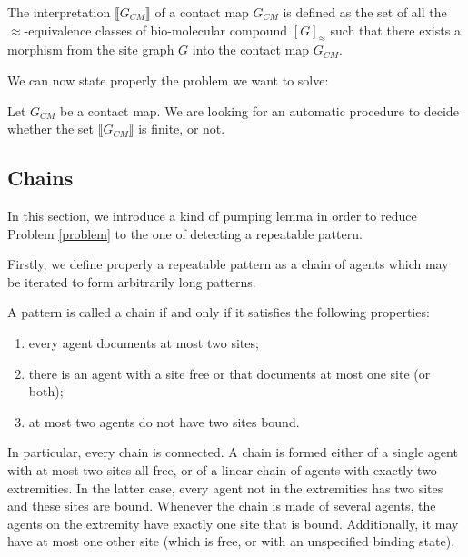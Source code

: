 \documentclass{entcs}
\newcommand{\graphsymb}{G}
\newcommand{\iso}{\approx}
\begin{document}
\begin{defn}
The interpretation $\llbracket \graphsymb_{\textit{CM}} \rrbracket$ of a contact map $\graphsymb_{\textit{CM}}$ is defined as the set of all the $\iso$-equivalence classes of bio-molecular compound $[G]_{\iso}$ such that there exists a morphism from the site graph $G$ into the contact map $\graphsymb_{\textit{CM}}$.
\end{defn}

We can now state properly the problem we want to solve:
\begin{problem}\label{problem}
Let $\graphsymb_{\textit{CM}}$ be a contact map.
We are looking for an automatic procedure to decide whether
the set $\llbracket \graphsymb_{\textit{CM}} \rrbracket$ is finite, or not.
\end{problem}

\subsection{Chains}

In this section, we introduce a kind of pumping lemma in order to reduce
Problem \ref{problem} to the one of detecting a repeatable pattern.

Firstly, we define properly a repeatable pattern as a chain of agents which may be iterated to form arbitrarily long patterns.

\begin{defn}[chain]
A pattern is called a chain if and only if it satisfies the following properties:
\begin{enumerate}
  \item every agent documents at most two sites;
  \item there is an agent with a site free or
  that documents at most one site (or both);
  \item at most two agents do not have two sites bound.
\end{enumerate}
\end{defn}

In particular, every chain is connected.
A chain is formed either of a single agent with at most two sites all free, or of a linear chain of agents with exactly two extremities. In the latter case, every agent not in the extremities has two sites and these sites are bound. Whenever the chain is made of several agents, the agents on the extremity have exactly one site that is bound. Additionally, it may have at most one other site (which is free, or with an unspecified binding state).
\end{document}
